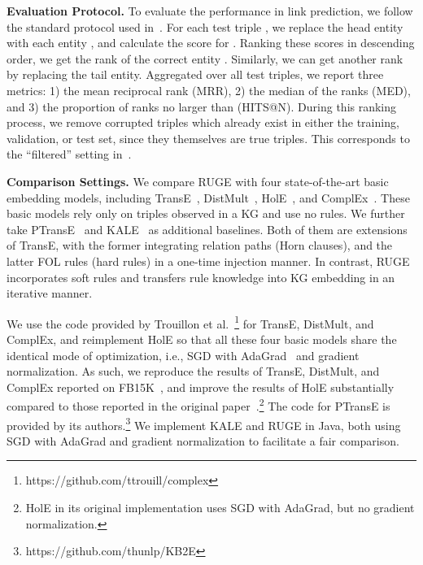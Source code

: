 \documentclass[letterpaper]{article} \usepackage{aaai18}  \usepackage{times}  \usepackage{helvet}  \usepackage{courier}  \usepackage{url}  \usepackage{graphicx}  \usepackage{amsmath}
\begin{document}
\smallskip
\noindent\textbf{Evaluation Protocol.} To evaluate the performance in link prediction, we follow the standard protocol used in~\cite{bordes2013:TransE}. For each test triple , we replace the head entity  with each entity , and calculate the score for . Ranking these scores in descending order, we get the rank of the correct entity . Similarly, we can get another rank by replacing the tail entity. Aggregated over all test triples, we report three metrics: 1) the mean reciprocal rank (MRR), 2) the median of the ranks (MED), and 3) the proportion of ranks no larger than  (HITS@N). During this ranking process, we remove corrupted triples which already exist in either the training, validation, or test set, since they themselves are true triples. This corresponds to the ``filtered'' setting in~\cite{bordes2013:TransE}.

\smallskip
\noindent\textbf{Comparison Settings.} We compare RUGE with four state-of-the-art basic embedding models, including TransE~\cite{bordes2013:TransE}, DistMult~\cite{yang2015:DistMult}, HolE~\cite{nickel2016:HolE}, and ComplEx~\cite{trouillon2016:ComplEx}. These basic models rely only on triples observed in a KG and use no rules. We further take PTransE~\cite{lin2015:PTransE} and KALE~\cite{guo2016:KALE} as additional baselines. Both of them are extensions of TransE, with the former integrating relation paths (Horn clauses), and the latter FOL rules (hard rules) in a one-time injection manner. In contrast, RUGE incorporates soft rules and transfers rule knowledge into KG embedding in an iterative manner.

We use the code provided by Trouillon et al.~\footnote{https://github.com/ttrouill/complex} for TransE, DistMult, and ComplEx, and reimplement HolE so that all these four basic models share the identical mode of optimization, i.e., SGD with AdaGrad~\cite{duchi2011:AdaGrad} and gradient normalization. As such, we reproduce the results of TransE, DistMult, and ComplEx reported on FB15K~\cite{trouillon2016:ComplEx}, and improve the results of HolE substantially compared to those reported in the original paper~\cite{nickel2016:HolE}.\footnote{HolE in its original implementation uses SGD with AdaGrad, but no gradient normalization.} The code for PTransE is provided by its authors.\footnote{https://github.com/thunlp/KB2E} We implement KALE and RUGE in Java, both using SGD with AdaGrad and gradient normalization to facilitate a fair comparison.
\end{document}
